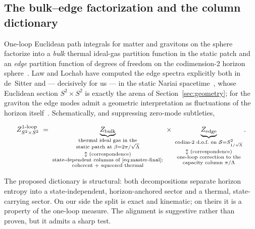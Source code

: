 \documentclass[11pt]{article}
\newcommand{\Nariai}{Nariai}
\begin{document}
\subsection{The bulk--edge factorization and the column dictionary}
\label{app:dictionary}

One-loop Euclidean path integrals for matter and gravitons on the sphere factorize into a \emph{bulk} thermal ideal-gas partition function in the static patch and an \emph{edge} partition function of degrees of freedom on the codimension-2 horizon sphere~\cite{ADLS,LawLochabPRL}. Law and Lochab have computed the edge spectra explicitly both in de~Sitter and --- decisively for us --- in the static \Nariai{} spacetime~\cite{LawLochabPRL,LawLochabPRD}, whose Euclidean section $S^2 \times S^2$ is exactly the arena of Section~\ref{sec:geometry}; for the graviton the edge modes admit a geometric interpretation as fluctuations of the horizon itself~\cite{LawLochabPRL, Ciambelli2026}. Schematically, and suppressing zero-mode subtleties,

\begin{equation}
Z^{\text{1-loop}}_{S^2 \times S^2}
\;=\;
\underbrace{Z_{\mathrm{bulk}}}_{\substack{\text{thermal ideal gas in the}\\ \text{static patch at } \beta = 2\pi/\sqrt{\Lambda}\\[2pt] \updownarrow \text{ (correspondence)}\\ \text{state-dependent columns of \eqref{eq:master-final}:}\\ \text{coherent + squeezed thermal}}}
\;\times\;
\underbrace{Z_{\mathrm{edge}}}_{\substack{\text{codim-2 d.o.f.\ on } \mathcal{S} = S^2_{1/\sqrt{\Lambda}}\\[2pt] \updownarrow \text{ (correspondence)}\\ \text{one-loop correction to the}\\ \text{capacity column } \pi/\Lambda}} .
\label{eq:dictionary}
\end{equation}

The proposed dictionary is structural: both decompositions separate horizon entropy into a state-independent, horizon-anchored sector and a thermal, state-carrying sector. On our side the split is exact and kinematic; on theirs it is a property of the one-loop measure. The alignment is suggestive rather than proven, but it admits a sharp test.
\end{document}

